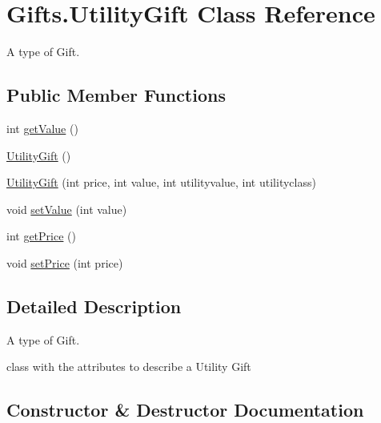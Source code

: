 \hypertarget{class_gifts_1_1_utility_gift}{}\section{Gifts.\+Utility\+Gift Class Reference}
\label{class_gifts_1_1_utility_gift}


A type of Gift.  


\subsection*{Public Member Functions}
\begin{DoxyCompactItemize}
\item 
int \hyperlink{class_gifts_1_1_utility_gift_a091e992419539418ca38c5711af14761}{get\+Value} ()
\item 
\hyperlink{class_gifts_1_1_utility_gift_ac97c4aaedbad02b4b6fd2f43b8d40bad}{Utility\+Gift} ()
\item 
\hyperlink{class_gifts_1_1_utility_gift_a4d1c14acee3c207b6c02b025f80e832d}{Utility\+Gift} (int price, int value, int utilityvalue, int utilityclass)
\item 
void \hyperlink{class_gifts_1_1_utility_gift_a40dfc7d666513e9953a2aa5af664565b}{set\+Value} (int value)
\item 
int \hyperlink{class_gifts_1_1_utility_gift_aa4bd57a0e827ad92023a5651d3690b06}{get\+Price} ()
\item 
void \hyperlink{class_gifts_1_1_utility_gift_a3b0702bb2129872af84e158051bcde83}{set\+Price} (int price)
\end{DoxyCompactItemize}


\subsection{Detailed Description}
A type of Gift. 

class with the attributes to describe a Utility Gift 

\subsection{Constructor \& Destructor Documentation}
\mbox{\label{class_gifts_1_1_utility_gift_ac97c4aaedbad02b4b6fd2f43b8d40bad}} 
